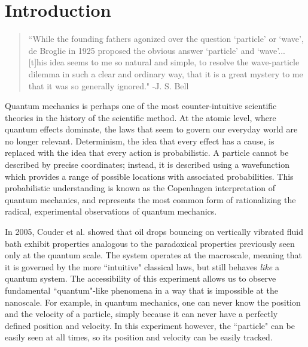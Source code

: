 		
\chapter*{Introduction}
\begin{quote}
	    ``While the founding fathers agonized over the question `particle' or `wave', de Broglie in 1925 proposed the obvious answer `particle' and `wave'... [t]his idea seems to me so natural and simple, to resolve the wave-particle dilemma in such a clear and ordinary way, that it is a great mystery to me that it was so generally ignored." -J. S. Bell
	    \end{quote}
	    

	    


Quantum mechanics is perhaps one of the most counter-intuitive scientific theories in the history of the scientific method. At the atomic level, where quantum effects dominate, the laws that seem to govern our everyday world are no longer relevant. Determinism, the idea that every effect has a cause, is replaced with the idea that every action is probabilistic. A particle cannot be described by precise coordinates; instead, it is described using a wavefunction which provides a range of possible locations with associated probabilities. This probabilistic understanding is known as the Copenhagen interpretation of quantum mechanics, and represents the most common form of rationalizing the radical, experimental observations of quantum mechanics. 

In 2005, Couder et al. showed that oil drops bouncing on vertically vibrated fluid bath exhibit properties analogous to the paradoxical properties previously seen only at the quantum scale.  The system operates at the macroscale, meaning that it is governed by the more ``intuitive" classical laws, but still behaves \textit{like} a quantum system. The accessibility of this experiment allows us to observe fundamental ``quantum"-like phenomena in a way that is impossible at the nanoscale. For example, in quantum mechanics, one can never know the position and the velocity of a particle, simply because it can never have a perfectly defined position and velocity. In this experiment however, the ``particle" can be easily seen at all times, so its position and velocity can be easily tracked. 

